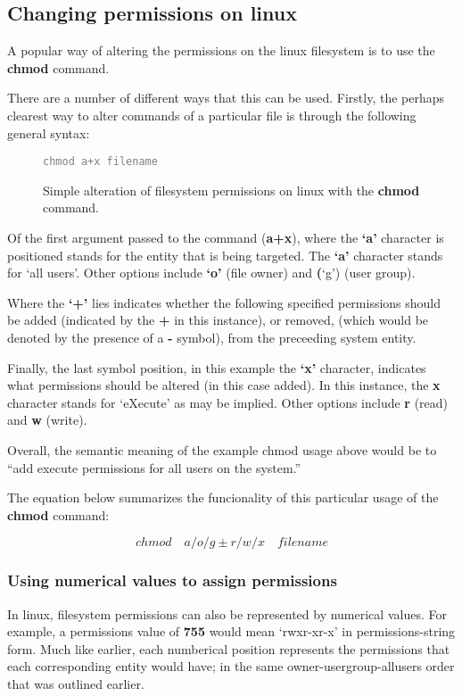 \documentclass{article}
\begin{document}
\subsection{Changing permissions on linux}
A popular way of altering the permissions on the linux filesystem is to use the \textbf{chmod} command.

There are a number of different ways that this can be used. Firstly, the perhaps clearest way to alter commands of a particular file is through the following general syntax:

\begin{figure}[h]
    \label{perms2}
    \textcolor{grey}{
      \texttt{chmod a+x filename}
    }
    \caption{Simple alteration of filesystem permissions on linux with the \textbf{chmod} command.}
\end{figure}

Of the first argument passed to the command (\textbf{a+x}), where the \textbf{`a'} character is positioned stands for the entity that is being targeted.
The \textbf{`a'} character stands for `all users'. Other options include \textbf{`o'} (file owner) and \textbf(`g') (user group).

Where the \textbf{`+'} lies indicates whether the following specified permissions should be added (indicated by the \textbf{+} in this instance), or removed,
(which would be denoted by the presence of a \textbf{-} symbol), from the preceeding system entity.

Finally, the last symbol position, in this example the \textbf{`x'} character, indicates what permissions should be altered (in this case added). In this instance,
the \textbf{x} character stands for `eXecute' as may be implied. Other options include \textbf{r} (read) and \textbf{w} (write).

Overall, the semantic meaning of the example chmod usage above would be to ``add execute permissions for all users on the system.''

The equation below summarizes the funcionality of this particular usage of the \textbf{chmod} command:

\begin{figure}[h]
\begin{equation}
  chmod \quad a/o/g \pm r/w/x \quad filename
\end{equation}
\end{figure}

\subsubsection{Using numerical values to assign permissions}
In linux, filesystem permissions can also be represented by numerical values. For example, a permissions value of \textbf{755} would mean
`rwxr-xr-x' in permissions-string form. Much like earlier, each numberical position represents the permissions that each corresponding entity would have;
in the same owner-usergroup-allusers order that was outlined earlier.
\end{document}
